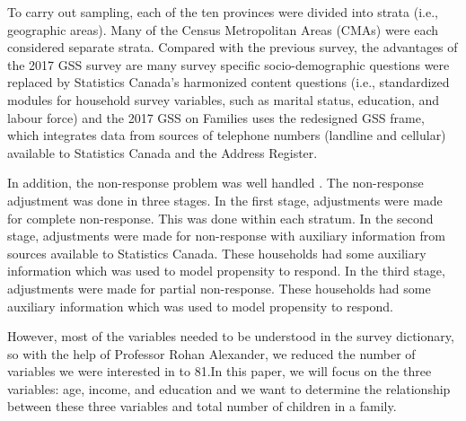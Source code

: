 \documentclass[
]{article}
\newenvironment{Shaded}{\begin{snugshade}}{\end{snugshade}}
\newcommand{\CommentTok}[1]{\textcolor[rgb]{0.56,0.35,0.01}{\textit{#1}}}
\newcommand{\DataTypeTok}[1]{\textcolor[rgb]{0.13,0.29,0.53}{#1}}
\newcommand{\KeywordTok}[1]{\textcolor[rgb]{0.13,0.29,0.53}{\textbf{#1}}}
\newcommand{\NormalTok}[1]{#1}
\newcommand{\OperatorTok}[1]{\textcolor[rgb]{0.81,0.36,0.00}{\textbf{#1}}}
\newcommand{\StringTok}[1]{\textcolor[rgb]{0.31,0.60,0.02}{#1}}
\begin{document}
To carry out sampling, each of the ten provinces were divided into
strata (i.e., geographic areas). Many of the Census Metropolitan Areas
(CMAs) were each considered separate strata. Compared with the previous
survey, the advantages of the 2017 GSS survey are many survey specific
socio-demographic questions were replaced by Statistics Canada's
harmonized content questions (i.e., standardized modules for household
survey variables, such as marital status, education, and labour force)
and the 2017 GSS on Families uses the redesigned GSS frame, which
integrates data from sources of telephone numbers (landline and
cellular) available to Statistics Canada and the Address Register.

In addition, the non-response problem was well handled . The
non-response adjustment was done in three stages. In the first stage,
adjustments were made for complete non-response. This was done within
each stratum. In the second stage, adjustments were made for
non-response with auxiliary information from sources available to
Statistics Canada. These households had some auxiliary information which
was used to model propensity to respond. In the third stage, adjustments
were made for partial non-response. These households had some auxiliary
information which was used to model propensity to respond.

However, most of the variables needed to be understood in the survey
dictionary, so with the help of Professor Rohan Alexander, we reduced
the number of variables we were interested in to 81.In this paper, we
will focus on the three variables: age, income, and education and we
want to determine the relationship between these three variables and
total number of children in a family.

\begin{Shaded}
\end{Shaded}
\end{document}
